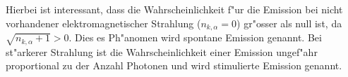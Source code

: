 Hierbei ist interessant, dass die Wahrscheinlichkeit f"ur die Emission bei nicht vorhandener elektromagnetischer Strahlung ($n_{k,\alpha} = 0$) gr"osser als null ist, da $\sqrt{n_{k,\alpha}+1} > 0$. Dies es Ph"anomen wird spontane Emission genannt. Bei st"arkerer Strahlung ist die Wahrscheinlichkeit einer Emission ungef"ahr proportional zu der Anzahl Photonen und wird stimulierte Emission genannt.